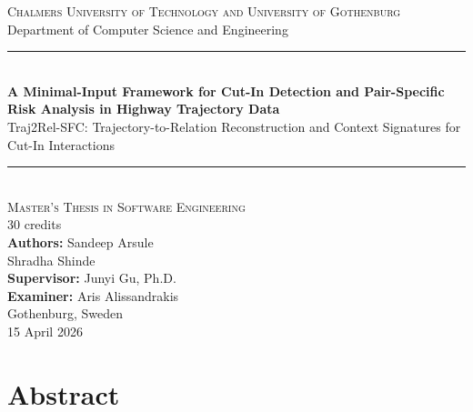 \documentclass[12pt,a4paper,twoside,openright]{report}
\newcommand{\ThesisTitle}{A Minimal-Input Framework for Cut-In Detection and Pair-Specific Risk Analysis in Highway Trajectory Data}
\newcommand{\FrameworkName}{Traj2Rel-SFC}
\newcommand{\ThesisSubtitle}{\FrameworkName: Trajectory-to-Relation Reconstruction and Context Signatures for Cut-In Interactions}
\newcommand{\AuthorOne}{Sandeep Arsule}
\newcommand{\AuthorTwo}{Shradha Shinde}
\newcommand{\SupervisorName}{Junyi Gu, Ph.D.}
\newcommand{\ExaminerName}{Aris Alissandrakis}
\newcommand{\UniversityName}{Chalmers University of Technology and University of Gothenburg}
\newcommand{\DepartmentName}{Department of Computer Science and Engineering}
\newcommand{\CityCountry}{Gothenburg, Sweden}
\newcommand{\ThesisDate}{15 April 2026}
\begin{document}

    \begin{titlepage}
        \thispagestyle{empty}
        \vspace*{1.2cm}

        \begin{center}
            {\Large \textsc{\UniversityName}}\\[0.35cm]
            {\large \DepartmentName}\\[1.1cm]

            {\color{accent}\rule{0.68\textwidth}{1.0pt}}\\[1.1cm]

            {\huge \bfseries \ThesisTitle}\\[0.7cm]
            {\Large \color{accent}\ThesisSubtitle}\\[1.1cm]

            {\color{accent}\rule{0.54\textwidth}{0.8pt}}\\[1.2cm]

            {\large \textsc{Master's Thesis in Software Engineering}}\\[0.2cm]
            {\normalsize 30 credits}\\[1.5cm]

            {\large
            \textbf{Authors:} \AuthorOne\\
            \hspace*{2.45cm}\AuthorTwo
            }\\[1.2cm]

            {\large
            \textbf{Supervisor:} \SupervisorName\\
            \textbf{Examiner:} \ExaminerName
            }\\[1.8cm]

            {\large \CityCountry}\\
            {\large \ThesisDate}
        \end{center}

        \vfill
    \end{titlepage}

    \cleardoublepage
    \chapter*{Abstract}
\end{document}
